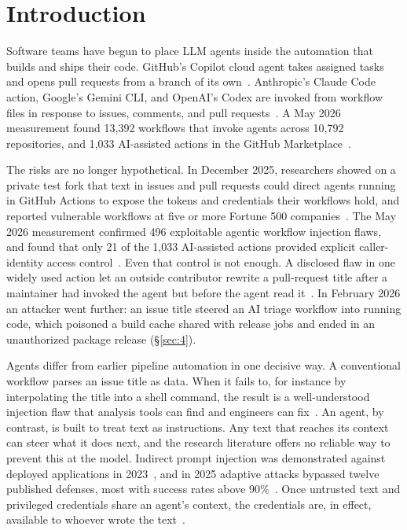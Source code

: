 \documentclass[acmsmall,screen,review]{acmart}
\begin{document}

\maketitle

\section{Introduction}\label{sec:1}

Software teams have begun to place LLM agents inside the automation that builds and ships their code. GitHub's Copilot cloud agent takes assigned tasks and opens pull requests from a branch of its own~\cite{githubndrisks}. Anthropic's Claude Code action, Google's Gemini CLI, and OpenAI's Codex are invoked from workflow files in response to issues, comments, and pull requests~\cite{anthropicndsecurity,daelman2025prompt}. A May 2026 measurement found 13,392 workflows that invoke agents across 10,792 repositories, and 1,033 AI-assisted actions in the GitHub Marketplace~\cite{wang2026demystifying}.

The risks are no longer hypothetical. In December 2025, researchers showed on a private test fork that text in issues and pull requests could direct agents running in GitHub Actions to expose the tokens and credentials their workflows hold, and reported vulnerable workflows at five or more Fortune 500 companies~\cite{daelman2025prompt}. The May 2026 measurement confirmed 496 exploitable agentic workflow injection flaws, and found that only 21 of the 1,033 AI-assisted actions provided explicit caller-identity access control~\cite{wang2026demystifying}. Even that control is not enough. A disclosed flaw in one widely used action let an outside contributor rewrite a pull-request title after a maintainer had invoked the agent but before the agent read it~\cite{stawinski2026trusting}. In February 2026 an attacker went further: an issue title steered an AI triage workflow into running code, which poisoned a build cache shared with release jobs and ended in an unauthorized package release (\S\ref{sec:4}).

Agents differ from earlier pipeline automation in one decisive way. A conventional workflow parses an issue title as data. When it fails to, for instance by interpolating the title into a shell command, the result is a well-understood injection flaw that analysis tools can find and engineers can fix~\cite{lobavcevski2021keeping,koishybayev2022characterizing,muralee2023argus}. An agent, by contrast, is built to treat text as instructions. Any text that reaches its context can steer what it does next, and the research literature offers no reliable way to prevent this at the model. Indirect prompt injection was demonstrated against deployed applications in 2023~\cite{greshake2023not}, and in 2025 adaptive attacks bypassed twelve published defenses, most with success rates above 90\%~\cite{nasr2025attacker}. Once untrusted text and privileged credentials share an agent's context, the credentials are, in effect, available to whoever wrote the text~\cite{willison2025lethal}.
\end{document}
